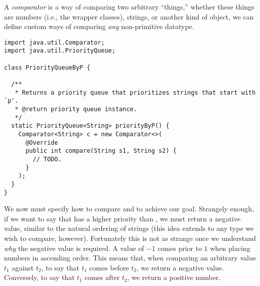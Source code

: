 A \emph{comparator} is a way of comparing two arbitrary ``things,'' whether these things are numbers (i.e., the wrapper classes), strings, or another kind of object, we can define custom ways of comparing \emph{any} non-primitive datatype.


\begin{cl}[]{}
\begin{lstlisting}[language=MyJava]
import java.util.Comparator;
import java.util.PriorityQueue;

class PriorityQueueByP {

  /**
   * Returns a priority queue that prioritizes strings that start with `p'.
   * @return priority queue instance.
   */
  static PriorityQueue<String> priorityByP() {
    Comparator<String> c = new Comparator<>(
      @Override
      public int compare(String s1, String s2) { 
        // TODO.
      }
    );
  }
}
\end{lstlisting}
\end{cl}

We now must specify how to compare  and  to achieve our goal. Strangely enough, if we want to say that  has a higher priority than , we must return a negative value, similar to the natural ordering of strings (this idea extends to any type we wish to compare, however). Fortunately this is not as strange once we understand \emph{why} the negative value is required. A value of $-1$ comes prior to $1$ when placing numbers in ascending order. This means that, when comparing an arbitrary value $t_1$ against $t_2$, to say that $t_1$ comes before $t_2$, we return a negative value. Conversely, to say that $t_1$ comes after $t_2$, we return a positive number.  

